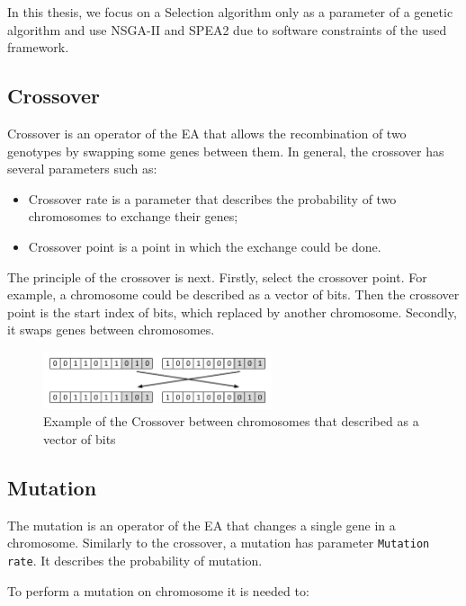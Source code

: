 In this thesis, we focus on a Selection algorithm only as a parameter of a genetic algorithm and use NSGA-II and SPEA2 due to software constraints of the used framework. 

\subsection{Crossover}\label{sec:GeneticAlgorithmCrossover}

Crossover is an operator of the EA that allows the recombination of two genotypes by swapping some genes between them.
In general, the crossover has several parameters such as:

\begin{itemize}
	\item Crossover rate is a parameter that describes the probability of two chromosomes to exchange their genes;
	\item Crossover point is a point in which the exchange could be done.
\end{itemize}

The principle of the crossover is next.
Firstly, select the crossover point. For example, a chromosome could be described as a vector of bits. Then the crossover point is the start index of bits, which replaced by another chromosome.
Secondly, it swaps genes between chromosomes.

\begin{figure}
	\centering
	\includegraphics[width=0.6\textwidth]{images/crossoverVector.pdf}
	\caption[Example of the Crossover]{Example of the Crossover between chromosomes that described as a vector of bits}
	\label{fig:crossoverVector}
\end{figure}

\subsection{Mutation}\label{sec:GeneticAlgorithmMutation}

The mutation is an operator of the EA that changes a single gene in a chromosome. Similarly to the crossover, a mutation has parameter \texttt{Mutation rate}. It describes the probability of mutation.

To perform a mutation on chromosome it is needed to:

